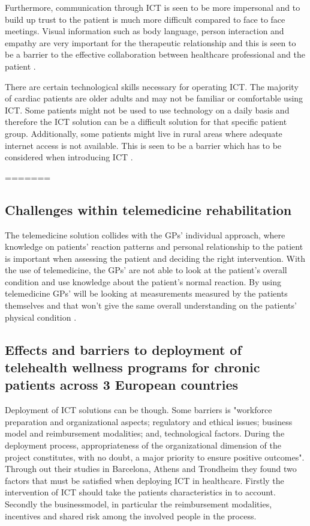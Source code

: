 Furthermore, communication through ICT is seen to be more impersonal and to build up trust to the patient is much more difficult compared to face to face meetings. Visual information such as body language, person interaction and empathy are very important for the therapeutic relationship and this is seen to be a barrier to the effective collaboration between healthcare professional and the patient \cite{barrier}.  

There are certain technological skills necessary for operating ICT. The majority of cardiac patients are older adults and may not be familiar or comfortable using ICT. Some patients might not be used to use technology on a daily basis and therefore the ICT solution can be a difficult solution for that specific patient group. Additionally, some patients might live in rural areas where adequate internet access is not available. This is seen to be a barrier which has to be considered when introducing ICT \cite{barrier}. 
   
=======
\subsection{Challenges within telemedicine rehabilitation} 
The telemedicine solution collides with the GPs’ individual approach, where knowledge on patients’ reaction patterns and personal relationship to the patient is important when assessing the patient and deciding the right intervention. With the use of telemedicine, the GPs’ are not able to look at the patient’s overall condition and use knowledge about the patient’s normal reaction. By using telemedicine GPs’ will be looking at measurements measured by the patients themselves and that won’t give the same overall understanding on the patients’ physical condition \cite{Emergence}.  

\subsection{Effects and barriers to deployment of telehealth wellness programs for chronic patients across 3 European countries}
Deployment of ICT solutions can be though. Some barriers is "workforce preparation and organizational aspects; regulatory and ethical issues; business model and reimbursement modalities; and, technological
factors. During the deployment process, appropriateness of the organizational dimension of the project constitutes, with no doubt, a major priority to ensure positive outcomes"\cite{effects}.
Through out their studies in Barcelona, Athens and Trondheim they found two factors that must be satisfied when deploying ICT in healthcare. Firstly the intervention of ICT should take the patients characteristics in to account. Secondly the businessmodel, in particular the reimbursement modalities, incentives and shared risk among the involved people in the process\cite{effects}.


